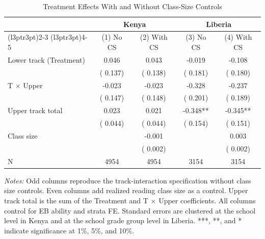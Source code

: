 \begin{table}[H]
\centering
\caption{Treatment Effects With and Without Class-Size Controls}
\label{tab:classsize_control}
\begin{threeparttable}
\fontsize{9}{11}\selectfont
\begin{tabular}[t]{lcccc}
\toprule
 & \multicolumn{2}{c}{Kenya} & \multicolumn{2}{c}{Liberia} \\
\cmidrule(l{3pt}r{3pt}){2-3} \cmidrule(l{3pt}r{3pt}){4-5}
 & (1) No CS & (2) With CS & (3) No CS & (4) With CS \\
\midrule
Lower track (Treatment) &   0.046 &   0.043 &  -0.019 &  -0.108 \\
 & (  0.137) & (  0.138) & (  0.181) & (  0.180) \\
\addlinespace
T $\times$ Upper &  -0.023 &  -0.023 &  -0.328 &  -0.237 \\
 & (  0.147) & (  0.148) & (  0.201) & (  0.189) \\
\addlinespace
Upper track total &   0.023 &   0.021 &  -0.348** &  -0.345** \\
 & (  0.044) & (  0.044) & (  0.154) & (  0.151) \\
\addlinespace
Class size & &  -0.001 & &   0.003 \\
 & & (  0.002) & & (  0.002) \\
\addlinespace
N & 4954 & 4954 & 3154 & 3154 \\
\bottomrule
\end{tabular}
\begin{tablenotes}
\footnotesize
\item \textit{Notes:} Odd columns reproduce the track-interaction specification without class size controls. Even columns add realized reading class size as a control. Upper track total is the sum of the Treatment and T $\times$ Upper coefficients. All columns control for EB ability and strata FE\@. Standard errors are clustered at the school level in Kenya and at the school grade group level in Liberia. ***, **, and * indicate significance at 1\%, 5\%, and 10\%.
\end{tablenotes}
\end{threeparttable}
\end{table}
